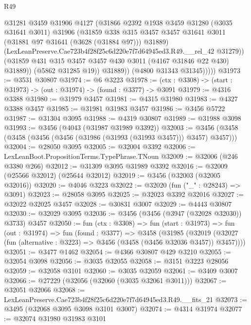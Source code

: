 \begin{lexlean}{R49}
\begin{coremodule}
                    @31281
                    @3459
                    @31906
                    @4127
                    (@31866
                      @2392
                      @1938
                      @3459
                      @31280
                      (@3035 @31641 @3011)
                      @31906
                      (@31859
                        @338
                        @315
                        @3457
                        @3457
                        @31641
                        @3011
                        (@31881 @97 @31641 (@3628 (@31884 @97)))
                        @31889)
                      (LexLeanPreserve.Cae723b4f28f25c6d220e7f7d64945ed3.R49.__rel_42 @31279))
                    (@31859 @431 @315 @3457 @3457 @430 @3011 (@4167 @31846 @22 @430) @31889))
                  (@5862 @31285 @19))
                @31889))
            (@4800 @31343 @31345)))))
@31973 := @3531 @30807
@31974 := @6 @3223
@31978 := (ctx : @3308) -> (start : @31973) -> (out : @31974) -> (found : @3377) -> @3091
@31979 := @4316 @3388
@31980 := @31979 @3457
@31981 := @4315 @31980
@31983 := @4327 @3388 @3457
@31985 := @31981 @31983 @3457
@31986 := @3456 @5722
@31987 := @31304 @3095
@31988 := @4319 @30807
@31989 := @31988 @3098
@31993 := @3456 (@4043 (@31987 @31989 @3392))
@32003 := @3456 (@3458 (@3458 (@3456 (@3456 (@31986 (@31993 (@31993 @3457))) @3457) @3457)))
@32004 := @28050 @3095
@32005 := @32004 @3392
@32006 := LexLeanBoot.PropositionTerms.TypePhrase.TNoun
@32009 := @32006 (@246 @3380 @266)
@32012 := @31309 @3095 @31989 @3392
@32016 := @32009 (@25566 @32012) (@25644 @32012)
@32019 := @3456 (@32003 (@32005 @32016))
@32020 := @4046 @3223
@32022 := @32020 (fun ("_" : @28243) => @3091)
@32023 := @28058 @3095
@32025 := @32023 @3392 @32016
@32027 := @32022 @32025 @3457
@32028 := @30831 @3007
@32029 := @4443 @30807
@32030 := @32029 @3095
@32036 := @3456 (@3456 (@3947 (@32028 @32030)) @3733) @3457
@32050 := fun (ctx : @3308) =>
  fun (start : @31973) =>
  fun (out : @31974) =>
  fun (found : @3377) =>
  @3458
    (@31985
      (@32019 (@32027 (fun (alternative : @3223) => @3456 (@3458 (@3456 @32036 @3457)) @3457))))
@32051 := @3477 @1462
@32054 := @4366 @30807 @429 @3210
@32055 := @32054 @3098
@32056 := @3035 @32055
@32058 := @3151 @3223 @28056
@32059 := @32058 @3101
@32060 := @3035 @32059
@32061 := @3409 @3007
@32066 := @27229 (@32056 (@32060 (@3035 @32061 @3011)))
@32067 := @32051 @32066
@32068 := LexLeanPreserve.Cae723b4f28f25c6d220e7f7d64945ed3.R49.__fits_21
@32073 := @3495 (@32068 @3095 @3098 @3101 @3007)
@32074 := @4314 @31974
@32077 := @32074 @31980 @31983 @3101

\end{coremodule}
\end{lexlean}
